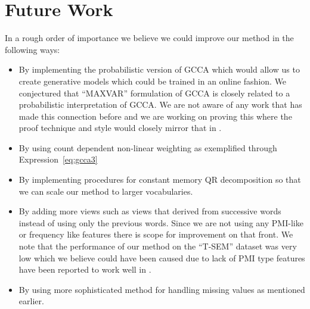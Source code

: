 \documentclass[11pt]{article}
\begin{document}

\section{Future Work}
\label{sec:futurework}
In a rough order of importance we believe we could improve our method in the following ways:
\begin{itemize}[leftmargin=*]
  \itemsep-0.1em
  \renewcommand\labelitemi{--}
\item By implementing the probabilistic version of GCCA which would
  allow us to create generative models which could be trained in an
  online fashion. We conjectured that ``MAXVAR'' formulation of GCCA is closely related to a probabilistic interpretation of GCCA. We are not aware of any work
that has made this connection before and we are working on proving this where the proof technique and style would closely mirror that in \cite{bach2005probabilistic}.
\item By using count dependent non-linear weighting as exemplified
  through Expression~\ref{eq:gcca3}
\item By implementing procedures for constant memory QR decomposition so that we can scale our method to larger vocabularies. 
\item By adding more views such as views that derived from successive
  words instead of  using only the previous words. Since we are not using
  any PMI-like or frequency like features there is scope for
  improvement on that front.  We note that the performance of our
  method on the ``T-SEM'' dataset was very low which we believe could
  have been caused due to lack of PMI type features have been reported
  to work well in \cite{levy2014neural}.  
\item By using more sophisticated method for handling missing values
  as mentioned earlier.

\end{itemize}
\end{document}

